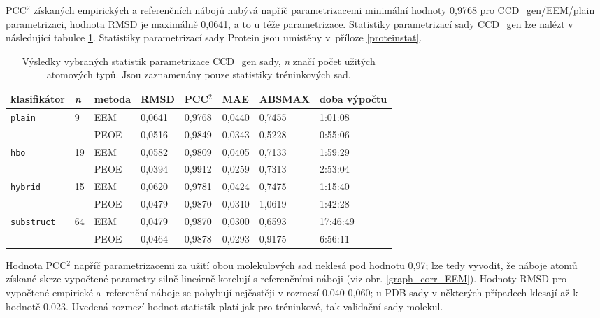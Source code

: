 PCC$^2$ získaných empirických a referenčních nábojů nabývá napříč parametrizacemi minimální hodnoty 0,9768 pro CCD\_gen/EEM/plain parametrizaci, hodnota RMSD je maximálně 0,0641, a to u téže parametrizace. Statistiky parametrizací sady CCD\_gen lze nalézt v následující tabulce \ref{statistics}. Statistiky parametrizací sady Protein jsou umístěny v~příloze \ref{proteinstat}. 
\medskip
\begin{table}[h]
    \small
    \renewcommand{\arraystretch}{1.4}
    \centering
    \begin{tabular}{l|l|l|l|l|l|l|l}
         \textbf{klasifikátor} & \textbf{\textit{n}} & \textbf{metoda} & \textbf{RMSD} & \textbf{PCC$^2$} & \textbf{MAE} & \textbf{ABSMAX} & \textbf{doba výpočtu}\\
         \hline
         \multirow{2}{6em}{\texttt{plain}} & \multirow{2}{1.5em}{ 9} & EEM & 0,0641 & 0,9768 & 0,0440 & 0,7455 & 1:01:08 \\
         & & PEOE & 0,0516 & 0,9849 & 0,0343 & 0,5228 & 0:55:06 \\
         \hline
         \multirow{2}{6em}{\texttt{hbo}} & \multirow{2}{1.5em}{19} & EEM & 0,0582 & 0,9809 & 0,0405 & 0,7133 & 1:59:29  \\
         & & PEOE & 0,0394 & 0,9912 & 0,0259 & 0,7313 & 2:53:04 \\
         \hline
         \multirow{2}{6em}{\texttt{hybrid}} & \multirow{2}{1.5em}{15} & EEM & 0,0620 & 0,9781 & 0,0424 & 0,7475 & 1:15:40 \\
         & & PEOE & 0,0479 & 0,9870 & 0,0310 & 1,0619 & 1:42:28 \\
         \hline
         \multirow{2}{6em}{\texttt{substruct}} & \multirow{2}{1.5em}{64} & EEM & 0,0479 & 0,9870 & 0,0300 & 0,6593 & 17:46:49 \\
         & & PEOE & 0,0464 & 0,9878 & 0,0293 & 0,9175 & 6:56:11 
    \end{tabular}
    \caption{Výsledky vybraných statistik parametrizace CCD\_gen sady, \textit{n} značí počet užitých atomových typů. Jsou zaznamenány pouze statistiky tréninkových sad.}
    \label{statistics}
\end{table}
\medskip

Hodnota PCC$^2$ napříč parametrizacemi za užití obou molekulových sad neklesá pod hodnotu 0,97; lze tedy vyvodit, že náboje atomů získané skrze vypočtené parametry silně lineárně korelují s referenčními náboji (viz obr. \ref{graph_corr_EEM}). Hodnoty RMSD pro vypočtené empirické a~referenční náboje se pohybují nejčastěji v rozmezí 0,040-0,060; u PDB sady v některých případech klesají až k hodnotě 0,023. Uvedená rozmezí hodnot statistik platí jak pro tréninkové, tak validační sady molekul. 

